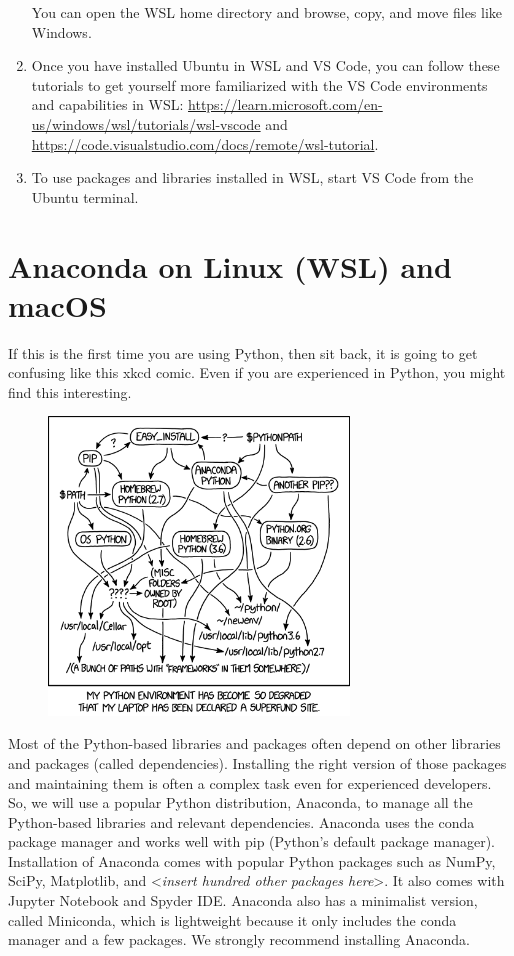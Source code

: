 \documentclass[12pt]{article}
\begin{document}
\begin{enumerate}[label={\arabic*.}, leftmargin= 0.6 cm,itemsep = 0.25cm,topsep= .25cm]
You can open the WSL home directory and browse, copy, and move files like Windows.

\item Once you have installed Ubuntu in WSL and VS Code, you can follow these tutorials to get yourself more familiarized with the VS Code environments and capabilities in WSL:
\url{https://learn.microsoft.com/en-us/windows/wsl/tutorials/wsl-vscode} and \url{https://code.visualstudio.com/docs/remote/wsl-tutorial}.

\item To use packages and libraries installed in WSL, start VS Code from the Ubuntu terminal.

\end{enumerate}

\section*{Anaconda on Linux (WSL) and macOS}

If this is the first time you are using Python, then sit back, it is going to get confusing like this xkcd comic. Even if you are experienced in Python, you might find this interesting.\\

\begin{figure}[ht]
    \centering
    \includegraphics[width=8cm]{xkcd-python.png}
\end{figure}

Most of the Python-based libraries and packages often depend on other libraries and packages (called dependencies). Installing the right version of those packages and maintaining them is often a complex task even for experienced developers. So, we will use a popular Python distribution, Anaconda, to manage all the Python-based libraries and relevant dependencies. Anaconda uses the conda package manager and works well with pip (Python's default package manager). Installation of Anaconda comes with popular Python packages such as NumPy, SciPy, Matplotlib, and <\emph{insert hundred other packages here}>. It also comes with Jupyter Notebook and Spyder IDE. Anaconda also has a minimalist version, called Miniconda, which is lightweight because it only includes the conda manager and a few packages. We strongly recommend installing Anaconda.
\end{document}
